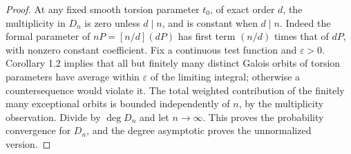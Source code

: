 \begin{proof}
At any fixed smooth torsion parameter $t_0$, of exact order
$d$, the multiplicity in $D_n$ is zero unless $d\mid n$,
and is constant when $d\mid n$. Indeed the formal parameter
of $nP=[n/d](dP)$ has first term $(n/d)$ times that of $dP$,
with nonzero constant coefficient. Fix a continuous test
function and $\varepsilon>0$. Corollary 1.2 implies that
all but finitely many distinct Galois orbits of torsion
parameters have average within $\varepsilon$ of the limiting
integral; otherwise a countersequence would violate it.
The total weighted contribution of the finitely many
exceptional orbits is bounded independently of $n$, by
the multiplicity observation. Divide by $\deg D_n$ and
let $n\to\infty$. This proves the probability convergence
for $D_n$, and the degree asymptotic proves the unnormalized
version.
\end{proof}
